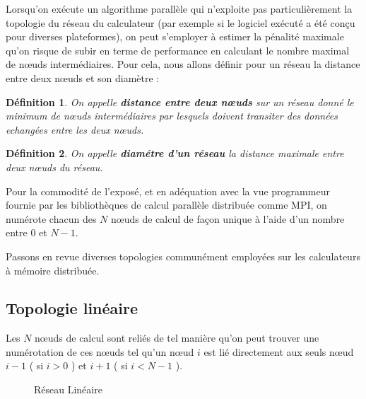\documentclass[fleqn,11pt]{article}
\newtheorem{defi}{Définition}
\begin{document}
Lorsqu'on exécute un algorithme parallèle qui n'exploite pas particulièrement la topologie du réseau
du calculateur (par exemple si le logiciel exécuté a été conçu pour diverses plateformes), on peut
s'employer à estimer la pénalité maximale qu'on risque de subir en terme de performance en calculant 
le nombre maximal de nœuds intermédiaires. Pour cela, nous allons définir pour un réseau la 
distance entre deux nœuds et son diamètre :

\begin{defi}
On appelle \textbf{distance entre deux nœuds} sur un réseau donné le minimum de nœuds
intermédiaires par lesquels doivent transiter des données echangées entre les deux
nœuds.
\end{defi}

\begin{defi}
On appelle \textbf{diamétre d'un réseau} la distance maximale entre
deux nœuds du réseau. 
\end{defi}

Pour la commodité de l'exposé, et en adéquation avec la vue programmeur
fournie par les bibliothèques de calcul parallèle distribuée comme MPI, on numérote
chacun des $N$ nœuds de calcul de façon unique à l'aide d'un nombre entre
0 et $N-1$.

Passons en revue diverses topologies communément employées sur les calculateurs à mémoire distribuée.

\subsection{Topologie linéaire}

Les $N$ nœuds de calcul sont reliés de tel manière qu'on peut trouver une numérotation
de ces nœuds tel qu'un nœud $i$ est lié directement aux seuls
nœud $i-1$ ( si $ i > 0$ ) et $i+1$ ( si $i < N-1$ ).

\begin{figure}
\begin{center}
\end{center}
\caption{Réseau Linéaire}
\label{fig:reslin}
\end{figure}
\end{document}
